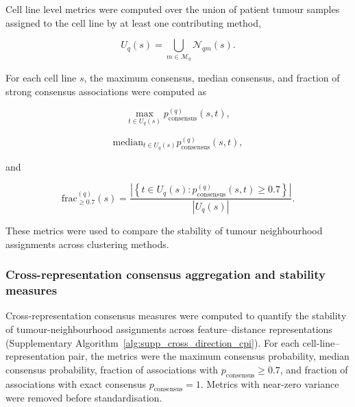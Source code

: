 Cell line level metrics were computed over the union of patient tumour
samples assigned to the cell line by at least one contributing
method,

\begin{equation}
U_q(s) =
\bigcup_{m \in \mathcal{M}_q} \mathcal{N}_{qm}(s).
\end{equation}

For each cell line \(s\), the maximum consensus, median consensus, and
fraction of strong consensus associations were computed as

\begin{equation}
\max_{t \in U_q(s)}
p_{\mathrm{consensus}}^{(q)}(s,t),
\end{equation}

\begin{equation}
\mathrm{median}_{t \in U_q(s)}
p_{\mathrm{consensus}}^{(q)}(s,t),
\end{equation}

and

\begin{equation}
\mathrm{frac}_{\geq 0.7}^{(q)}(s) =
\frac{
\left|
\left\{
t \in U_q(s) :
p_{\mathrm{consensus}}^{(q)}(s,t) \geq 0.7
\right\}
\right|
}{
|U_q(s)|
}.
\end{equation}

These metrics were used to compare the stability of tumour
neighbourhood assignments across clustering methods.

\subsubsection{Cross-representation consensus aggregation and stability measures}

Cross-representation consensus measures were computed to quantify the stability
of tumour-neighbourhood assignments across feature--distance representations
(Supplementary Algorithm~\ref{alg:supp_cross_direction_cpi}). For each
cell-line--representation pair, the metrics were the maximum
consensus probability, median consensus probability, fraction of associations
with \(p_{\mathrm{consensus}} \geq 0.7\), and fraction of associations with exact
consensus \(p_{\mathrm{consensus}}=1\). Metrics with near-zero variance were
removed before standardisation.

